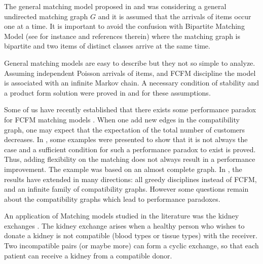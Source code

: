\documentclass{llncs}
\begin{document}
The general matching model proposed in \cite{MBMa21} and  \cite{MaMo18}
was considering a general undirected matching graph $G$ and it is assumed that the arrivals of items occur one at a time.
It is important to avoid the confusion with Bipartite Matching Model (see for instance  \cite{BGMa13}  and references therein) 
where the matching graph is bipartite
and   two items of distinct classes arrive at the same time. 

General matching models are easy to describe but they not so simple to analyze. 
Assuming independent Poisson arrivals of items, 
and FCFM discipline
the model is associated with an infinite Markov chain. 
A necessary condition of stability and a product form solution were proved in  \cite{MBMa21} and  \cite{MaMo18}
for these assumptions. 

Some of us have recently established that there exists some performance paradox for FCFM matching models \cite{CDFB21}. 
When one add  new edges in the compatibility graph, one may expect that the expectation of the total number of customers decreases. 
In \cite{CDFB21}, some examples were presented to 
show that it is not always the case and  a sufficient
condition for such a performance paradox to exist is proved. Thus, adding flexibility on the matching does not always result in a performance 
improvement. The example was based on an almost complete graph. In \cite{BCDF24}, 
the results have extended  
in many directions: all greedy disciplines instead of FCFM, and an infinite family of compatibility graphs. However
some questions remain about the compatibility graphs which lead to performance paradoxes. 
 
An application of Matching models  studied in the literature was the kidney 
exchanges \cite{KidneySite,Unve10,AJMa13}. 
The  kidney exchange arises when a healthy person who wishes to donate a kidney is 
not compatible (blood types or tissue types) with the receiver. Two incompatible pairs (or maybe more) can form a cyclic exchange, so
that each patient can receive a kidney from a compatible donor. %
\end{document}
